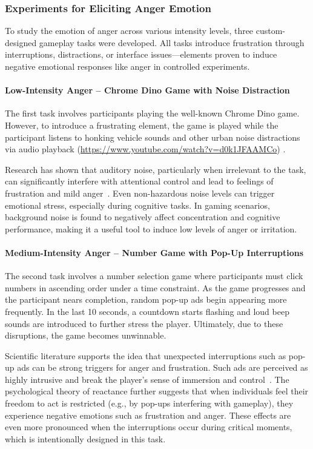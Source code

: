 \subsubsection{Experiments for Eliciting Anger Emotion}

To study the emotion of anger across various intensity levels, three custom-designed gameplay tasks were developed. All tasks introduce frustration through interruptions, distractions, or interface issues—elements proven to induce negative emotional responses like anger in controlled experiments.

\paragraph*{Low-Intensity Anger – Chrome Dino Game with Noise Distraction}

The first task involves participants playing the well-known Chrome Dino game. However, to introduce a frustrating element, the game is played while the participant listens to honking vehicle sounds and other urban noise distractions via audio playback (\url{https://www.youtube.com/watch?v=d0k1JFAAMCo}) \citep{soundsforyou_traffic_noise}.

Research has shown that auditory noise, particularly when irrelevant to the task, can significantly interfere with attentional control and lead to feelings of frustration and mild anger~\citep{choi2013audio}. Even non-hazardous noise levels can trigger emotional stress, especially during cognitive tasks. In gaming scenarios, background noise is found to negatively affect concentration and cognitive performance, making it a useful tool to induce low levels of anger or irritation.

\paragraph*{Medium-Intensity Anger – Number Game with Pop-Up Interruptions}

The second task involves a number selection game where participants must click numbers in ascending order under a time constraint. As the game progresses and the participant nears completion, random pop-up ads begin appearing more frequently. In the last 10 seconds, a countdown starts flashing and loud beep sounds are introduced to further stress the player. Ultimately, due to these disruptions, the game becomes unwinnable.

Scientific literature supports the idea that unexpected interruptions such as pop-up ads can be strong triggers for anger and frustration. Such ads are perceived as highly intrusive and break the player's sense of immersion and control~\citep{hanbazazh2021pop}. The psychological theory of reactance further suggests that when individuals feel their freedom to act is restricted (e.g., by pop-ups interfering with gameplay), they experience negative emotions such as frustration and anger. These effects are even more pronounced when the interruptions occur during critical moments, which is intentionally designed in this task.

